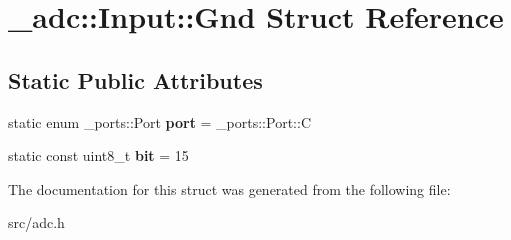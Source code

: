 \hypertarget{struct__adc_1_1Input_1_1Gnd}{}\section{\+\_\+adc\+:\+:Input\+:\+:Gnd Struct Reference}
\label{struct__adc_1_1Input_1_1Gnd}
\subsection*{Static Public Attributes}
\begin{DoxyCompactItemize}
\item 
static enum \+\_\+ports\+::\+Port {\bfseries port} = \+\_\+ports\+::\+Port\+::C\hypertarget{struct__adc_1_1Input_1_1Gnd_afa1beb4437eb56baa071320fe7540603}{}\label{struct__adc_1_1Input_1_1Gnd_afa1beb4437eb56baa071320fe7540603}

\item 
static const uint8\+\_\+t {\bfseries bit} = 15\hypertarget{struct__adc_1_1Input_1_1Gnd_abd89dd32c49126ff70e3687927255c45}{}\label{struct__adc_1_1Input_1_1Gnd_abd89dd32c49126ff70e3687927255c45}

\end{DoxyCompactItemize}


The documentation for this struct was generated from the following file\+:\begin{DoxyCompactItemize}
\item 
src/adc.\+h\end{DoxyCompactItemize}
